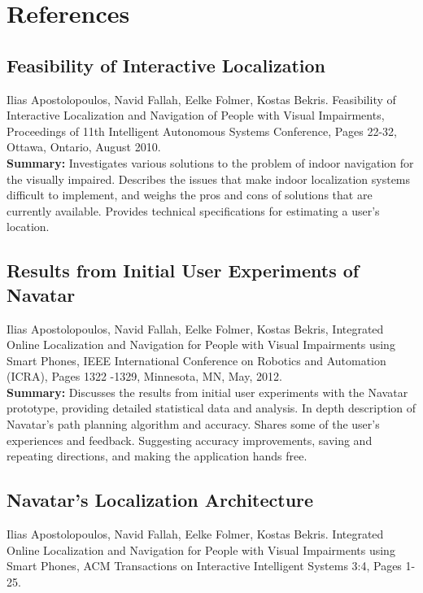 \documentclass{scrreprt}
\begin{document}
\chapter{References}

\section{Feasibility of Interactive Localization}
Ilias Apostolopoulos, Navid Fallah, Eelke Folmer, Kostas Bekris. Feasibility of Interactive Localization and Navigation of People with Visual Impairments, Proceedings of 11th Intelligent Autonomous Systems Conference, Pages 22-32, Ottawa, Ontario, August 2010.\\
 
 \textbf{Summary:}
 Investigates various solutions to the problem of indoor navigation for the visually impaired. Describes the issues that make indoor localization systems difficult to implement, and weighs the pros and cons of solutions that are currently available. Provides technical specifications for estimating a user’s location.
 
\section{Results from Initial User Experiments of Navatar}
Ilias Apostolopoulos, Navid Fallah, Eelke Folmer, Kostas Bekris, Integrated Online Localization and Navigation for People with Visual Impairments using Smart Phones, IEEE International Conference on Robotics and Automation (ICRA), Pages 1322 -1329, Minnesota, MN, May, 2012.\\

\textbf{Summary:}
Discusses the results from initial user experiments with the Navatar prototype, providing detailed statistical data and analysis. In depth description of Navatar's path planning algorithm and accuracy. Shares some of the user's experiences and feedback. Suggesting accuracy improvements, saving and repeating directions, and making the application hands free.

\section{Navatar's Localization Architecture}
 Ilias Apostolopoulos, Navid Fallah, Eelke Folmer, Kostas Bekris. Integrated Online Localization and Navigation for People with Visual Impairments using Smart Phones, ACM Transactions on Interactive Intelligent Systems 3:4, Pages 1-25.\\
\end{document}
